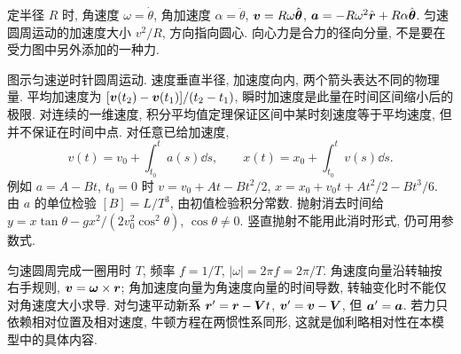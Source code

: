 定半径 $R$ 时, 角速度 $\omega=\dot\theta$, 角加速度 $\alpha=\ddot\theta$, $\boldsymbol{v}=R\omega\hat{\boldsymbol{\theta}}$, $\boldsymbol{a}=-R\omega^2\hat{\boldsymbol{r}}+R\alpha\hat{\boldsymbol{\theta}}$. 匀速圆周运动的加速度大小 $v^2/R$, 方向指向圆心. 向心力是合力的径向分量, 不是要在受力图中另外添加的一种力.
\begin{center}
\end{center}
图示匀速逆时针圆周运动. 速度垂直半径, 加速度向内, 两个箭头表达不同的物理量.
平均加速度为 $[\boldsymbol{v}(t_2)-\boldsymbol{v}(t_1)]/(t_2-t_1)$, 瞬时加速度是此量在时间区间缩小后的极限. 对连续的一维速度, 积分平均值定理保证区间中某时刻速度等于平均速度, 但并不保证在时间中点. 对任意已给加速度,
\begin{equation}
v(t)=v_0+\int_{t_0}^{t}a(s)\dd s,\qquad
x(t)=x_0+\int_{t_0}^{t}v(s)\dd s.
\end{equation}
例如 $a=A-Bt$, $t_0=0$ 时 $v=v_0+At-Bt^2/2$, $x=x_0+v_0t+At^2/2-Bt^3/6$. 由 $a$ 的单位检验 $[B]=L/T^3$, 由初值检验积分常数. 抛射消去时间给 $y=x\tan\theta-gx^2/(2v_0^2\cos^2\theta)$, $\cos\theta\ne0$. 竖直抛射不能用此消时形式, 仍可用参数式.

匀速圆周完成一圈用时 $T$, 频率 $f=1/T$, $|\omega|=2\pi f=2\pi/T$. 角速度向量沿转轴按右手规则, $\boldsymbol{v}=\boldsymbol{\omega}\times\boldsymbol{r}$; 角加速度向量为角速度向量的时间导数, 转轴变化时不能仅对角速度大小求导. 对匀速平动新系 $\boldsymbol{r}'=\boldsymbol{r}-\boldsymbol{V}t$, $\boldsymbol{v}'=\boldsymbol{v}-\boldsymbol{V}$, 但 $\boldsymbol{a}'=\boldsymbol{a}$. 若力只依赖相对位置及相对速度, 牛顿方程在两惯性系同形, 这就是伽利略相对性在本模型中的具体内容.
